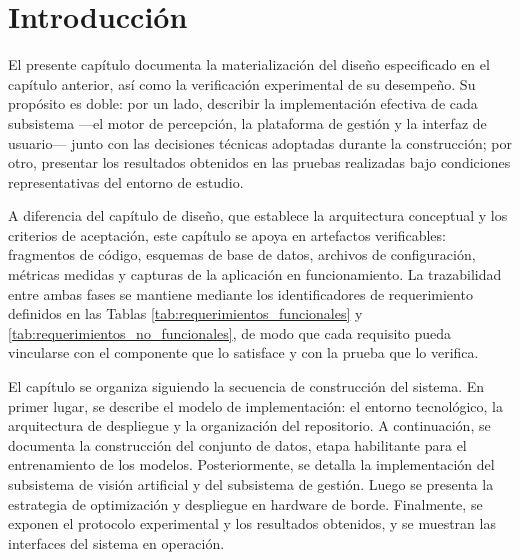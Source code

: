 \section{Introducción}

El presente capítulo documenta la materialización del diseño especificado en el
capítulo anterior, así como la verificación experimental de su desempeño. Su
propósito es doble: por un lado, describir la implementación efectiva de cada
subsistema ---el motor de percepción, la plataforma de gestión y la interfaz de
usuario--- junto con las decisiones técnicas adoptadas durante la construcción;
por otro, presentar los resultados obtenidos en las pruebas realizadas bajo
condiciones representativas del entorno de estudio.

A diferencia del capítulo de diseño, que establece la arquitectura conceptual y
los criterios de aceptación, este capítulo se apoya en artefactos verificables:
fragmentos de código, esquemas de base de datos, archivos de configuración,
métricas medidas y capturas de la aplicación en funcionamiento. La trazabilidad
entre ambas fases se mantiene mediante los identificadores de requerimiento
definidos en las Tablas \ref{tab:requerimientos_funcionales} y
\ref{tab:requerimientos_no_funcionales}, de modo que cada requisito pueda
vincularse con el componente que lo satisface y con la prueba que lo verifica.

El capítulo se organiza siguiendo la secuencia de construcción del sistema. En
primer lugar, se describe el modelo de implementación: el entorno tecnológico,
la arquitectura de despliegue y la organización del repositorio. A continuación,
se documenta la construcción del conjunto de datos, etapa habilitante para el
entrenamiento de los modelos. Posteriormente, se detalla la implementación del
subsistema de visión artificial y del subsistema de gestión. Luego se presenta
la estrategia de optimización y despliegue en hardware de borde. Finalmente, se
exponen el protocolo experimental y los resultados obtenidos, y se muestran las
interfaces del sistema en operación.
